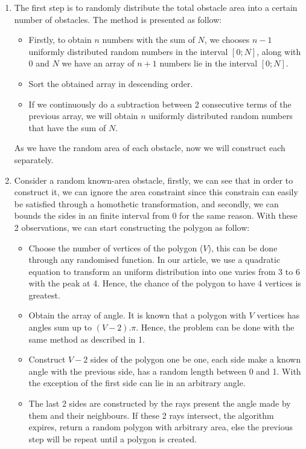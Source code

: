 \documentclass[final]{elsarticle}
\begin{document}
\begin{enumerate}
	\item The first step is to randomly distribute the total obstacle area into a certain number of obstacles. The method is presented as follow:
	\begin{itemize}
		\item Firstly, to obtain $n$ numbers with the sum of $N$, we chooses $n - 1$ uniformly distributed random numbers in the interval $[0; N]$, along with $0$ and $N$ we have an array of $n + 1$ numbers lie in the interval $[0; N]$.
		\item Sort the obtained array in descending order.
		\item If we continuously do a subtraction between 2 consecutive terms of the previous array, we will obtain $n$ uniformly distributed random numbers that have the sum of $N$.
	\end{itemize}
	As we have the random area of each obstacle, now we will construct each separately.
	\item Consider a random known-area obstacle, firstly, we can see that in order to construct it, we can ignore the area constraint since this constrain can easily be satisfied through a homothetic transformation, and secondly, we can bounds the sides in an finite interval from 0 for the same reason. With these 2 observations, we can start constructing the polygon as follow:
	\begin{itemize}
		\item Choose the number of vertices of the polygon ($V$), this can be done through any randomised function. In our article, we use a quadratic equation to transform an uniform distribution into one varies from 3 to 6 with the peak at 4. Hence, the chance of the polygon to have 4 vertices is greatest.
		\item Obtain the array of angle. It is known that a polygon with $V$ vertices has angles sum up to $(V - 2).\pi$. Hence, the problem can be done with the same method as described in 1.
		\item Construct $V - 2$ sides of the polygon one be one, each side make a known angle with the previous side, has a random length between 0 and 1. With the exception of the first side can lie in an arbitrary angle.
		\item The last 2 sides are constructed by the rays present the angle made by them and their neighbours. If these 2 rays intersect, the algorithm expires, return a random polygon with arbitrary area, else the previous step will be repeat until a polygon is created.

\end{itemize}
\end{enumerate}
\end{document}
